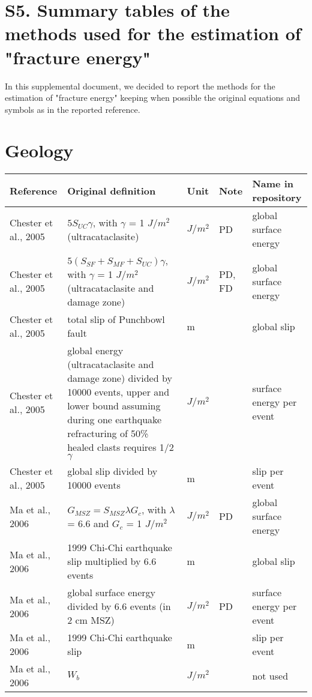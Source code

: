 \documentclass[12pt]{article}
\begin{document}
\section*{S5. Summary tables of the methods used for the estimation of "fracture energy"}

In this supplemental document, we decided to report the methods for the estimation of "fracture energy" keeping when possible the original equations and symbols as in the reported reference.

\section{Geology}
\begin{longtable}{|p{3.5 cm}|p{6.5 cm}|p{1.25 cm}|p{1.25 cm}|p{1.5 cm}|}
\hline
\textbf{Reference} & \textbf{Original definition} & \textbf{Unit} & \textbf{Note} & \textbf{Name in repository} \\ \hline
Chester et al., 2005 & \( \displaystyle 5 S_{UC} \gamma \), with $\gamma$ = 1 $J/m^2$ (ultracataclasite) & $J/m^2$ & PD & global surface energy \\
Chester et al., 2005 & \( \displaystyle 5(S_{SF}+S_{MF}+S_{UC}) \gamma \), with $\gamma$ = 1 $J/m^2$ (ultracataclasite and damage zone) & $J/m^2$ & PD, FD & global surface energy \\
Chester et al., 2005 & total slip of Punchbowl fault & m & & global slip \\
Chester et al., 2005 & global energy (ultracataclasite and damage zone) divided by 10000 events, upper and lower bound assuming during one earthquake refracturing of 50\% healed clasts requires 1/2 $\gamma$ & $J/m^2$ & & surface energy per event \\
Chester et al., 2005 & global slip divided by 10000 events & m & & slip per event \\
Ma et al., 2006 & \( \displaystyle  G_{MSZ} = S_{MSZ} \lambda G_c \), with $\lambda$ = 6.6 and $G_c$ = 1 $J/m^2$ & $J/m^2$ & PD & global surface energy \\
Ma et al., 2006 & 1999 Chi-Chi earthquake slip multiplied by 6.6 events & m & & global slip \\
Ma et al., 2006 & global surface energy divided by 6.6 events (in 2 cm MSZ) & $J/m^2$ & PD & surface energy per event \\
Ma et al., 2006 & 1999 Chi-Chi earthquake slip & m & & slip per event \\
Ma et al., 2006 & \( \displaystyle W_b \) & $J/m^2$ & & not used \\

\end{longtable}
\end{document}
